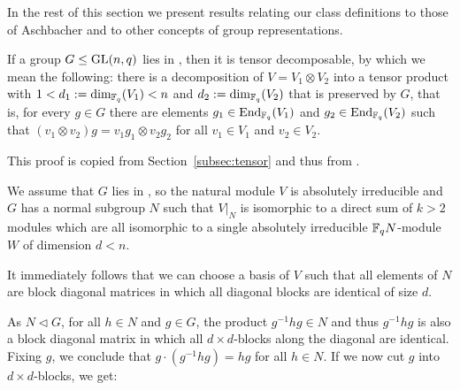 \medskip
In the rest of this section we present results relating our class
definitions to those of Aschbacher and to other concepts of group
representations.

\begin{Prop}
    \label{tensorprop}
If a group $G \le \GL(n,q)$ lies in , then it is tensor decomposable,
by which we mean the following:
there is a decomposition
of\/ $V = V_1 \otimes V_2$ into a tensor product with 
$1 < d_1 := \dim_{\mathbb{F}_q}(V_1) < n$
and $d_2 := \dim_{\mathbb{F}_q}(V_2)$ that is preserved by $G$, 
that is, for every $g \in
G$ there are elements $g_1 \in \End_{\F_q}(V_1)$ and $g_2 \in
\End_{\F_q}(V_2)$ such that $(v_1 \otimes v_2) g = v_1 g_1 \otimes v_2 g_2$
for all $v_1 \in V_1$ and $v_2 \in V_2$.
\end{Prop}
\proofbeg
This proof is copied from Section~\ref{subsec:tensor} and thus from 
\cite[Section~6.6]{subfieldpaper}.

We assume that $G$ lies in , so the natural module $V$ is
absolutely irreducible and $G$ has a normal subgroup $N$ such that
$V|_N$ is isomorphic to a direct sum of $k>2$ modules which are all
isomorphic to a single absolutely irreducible $\mathbb{F}_q N$-module $W$
of dimension $d < n$.

It immediately follows that we can choose a basis of $V$ such that all
elements of $N$ are block diagonal matrices in which all diagonal blocks
are identical of size $d$.

As $N \triangleleft G$, for all $h \in N$ and $g \in G$,
 the product $g^{-1}hg \in N$ and thus $g^{-1} h g$ is also 
a block diagonal matrix in which all $d \times d$-blocks along the diagonal
are identical. Fixing $g$, we conclude that $g\cdot (g^{-1}hg) = hg$ for all
$h \in N$. If we now cut $g$ into $d \times d$-blocks, we get:

